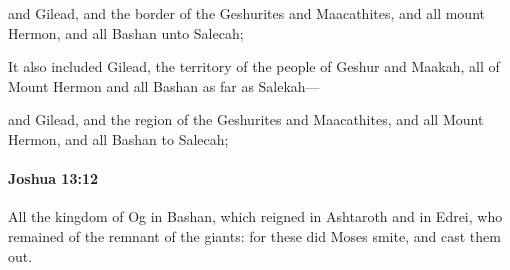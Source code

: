			\begin{versebox}
					\item[BHS] 
					\item[ASV] and Gilead, and the border of the Geshurites and Maacathites, and all mount Hermon, and all Bashan unto Salecah;
					\item[NIV] It also included Gilead, the territory of the people of Geshur and Maakah, all of Mount Hermon and all Bashan as far as Salekah—
					\item[NRSV] and Gilead, and the region of the Geshurites and Maacathites, and all Mount Hermon, and all Bashan to Salecah;
			\end{versebox}

		\paragraph{Joshua 13:12} %
			\label{JOSHUA-13-12}

			All the kingdom of Og in Bashan, which reigned in Ashtaroth and in Edrei, who remained of the remnant of the giants: for these did Moses smite, and cast them out.

